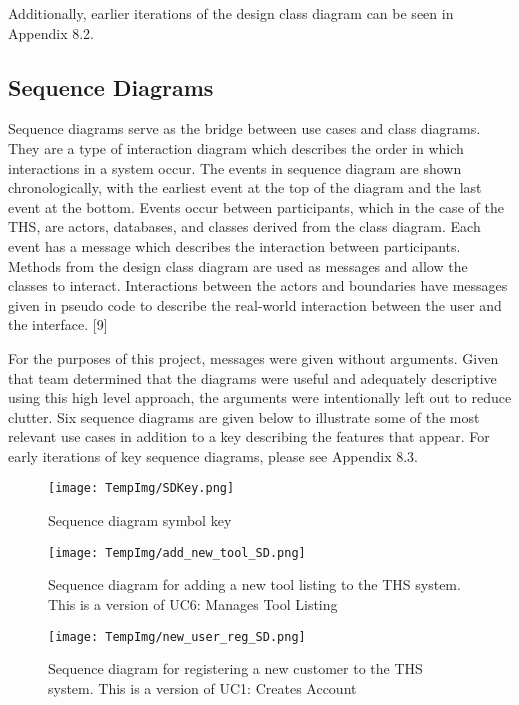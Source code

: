 \documentclass[fontsize=11pt]{extarticle}
\numberwithin{figure}{section} %
\numberwithin{table}{section}%
\begin{document}
Additionally, earlier iterations of the design class diagram can be seen
in Appendix 8.2.

\hypertarget{sequence-diagrams}{%
\subsection{Sequence Diagrams}\label{sequence-diagrams}}

Sequence diagrams serve as the bridge between use cases and class
diagrams. They are a type of interaction diagram which describes the
order in which interactions in a system occur. The events in sequence
diagram are shown chronologically, with the earliest event at the top of
the diagram and the last event at the bottom. Events occur between
participants, which in the case of the THS, are actors, databases, and
classes derived from the class diagram. Each event has a message which
describes the interaction between participants. Methods from the design
class diagram are used as messages and allow the classes to interact.
Interactions between the actors and boundaries have messages given in
pseudo code to describe the real-world interaction between the user and
the interface. {[}9{]}

For the purposes of this project, messages were given without arguments.
Given that team determined that the diagrams were useful and adequately
descriptive using this high level approach, the arguments were
intentionally left out to reduce clutter. Six sequence diagrams are
given below to illustrate some of the most relevant use cases in
addition to a key describing the features that appear. For early
iterations of key sequence diagrams, please see Appendix 8.3.

\begin{figure}[H]
      \centering
      \texttt{[image: TempImg/SDKey.png]}
      \caption{Sequence diagram symbol key}
\end{figure}

\begin{figure}[H]
      \centering
      \texttt{[image: TempImg/add\_new\_tool\_SD.png]}
      \caption{Sequence diagram for adding a new tool listing to the THS system. This is a version of UC6: Manages Tool Listing}
\end{figure}

\begin{figure}[H]
      \centering
      \texttt{[image: TempImg/new\_user\_reg\_SD.png]}
      \caption{Sequence diagram for registering a new customer to the THS system. This is a version of UC1: Creates Account}
\end{figure}
\end{document}
